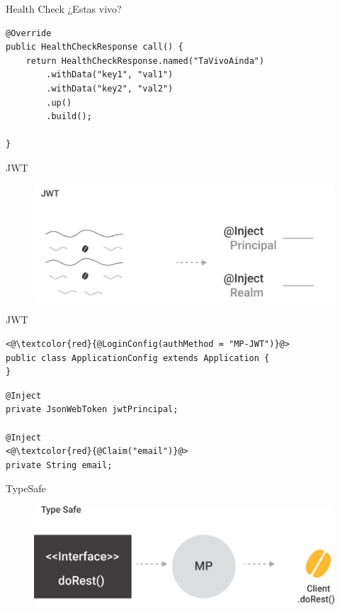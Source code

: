 \documentclass{beamer}
\begin{document}
\begin{frame}[fragile]{Health Check}
¿Estas vivo?
\begin{lstlisting}
@Override
public HealthCheckResponse call() {
	return HealthCheckResponse.named("TaVivoAinda")
		.withData("key1", "val1")
		.withData("key2", "val2")
		.up()
		.build();

}
\end{lstlisting}

\end{frame}


\begin{frame}{JWT}
\begin{figure}
	\centering
	\includegraphics[width=0.9\linewidth]{Images/jwt}
\end{figure}
\end{frame}


\begin{frame}[fragile]{JWT}

\begin{lstlisting}
<@\textcolor{red}{@LoginConfig(authMethod = "MP-JWT")}@>
public class ApplicationConfig extends Application {
}
\end{lstlisting}

\begin{lstlisting}
@Inject
private JsonWebToken jwtPrincipal;

@Inject
<@\textcolor{red}{@Claim("email")}@>
private String email;
\end{lstlisting}
\end{frame}

\begin{frame}{TypeSafe}
\begin{figure}
	\centering
	\includegraphics[width=0.75\linewidth]{Images/typesafe}
\end{figure}
\end{frame}
\end{document}
